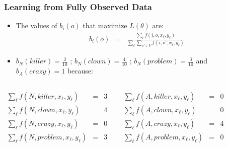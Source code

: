 \begin{frame}
\frametitle{Learning from Fully Observed Data}
\begin{itemize}[<+->]
\item The values of $b_{i}(o)$ that maximize $L(\theta)$ are:
\begin{eqnarray*}
b_i(o) & = & \frac{\sum_\ell f(i,o,x_\ell,y_\ell)}{\sum_\ell \sum_{o' \in V} f(i,o',x_\ell,y_\ell)} 
\end{eqnarray*}
\item $b_{N}(\textit{killer}) = \frac{3}{10}$ ;  $b_{N}(\textit{clown}) = \frac{4}{10}$ ; $b_{N}(\textit{problem}) = \frac{3}{10}$ and $b_{A}(\textit{crazy}) = 1$ because:
\end{itemize}

\begin{columns}[c]

\column{2in}
{\small\begin{eqnarray*}
\sum_\ell f(N, \textit{killer}, x_\ell, y_\ell) & = & 3 \\
\sum_\ell f(N, \textit{clown}, x_\ell, y_\ell) & = & 4 \\ 
\sum_\ell f(N, \textit{crazy}, x_\ell, y_\ell) & = & 0 \\ 
\sum_\ell f(N, \textit{problem}, x_\ell, y_\ell) & = & 3 \\ 
\end{eqnarray*}}

\column{1.5in}
{\small\begin{eqnarray*}
\sum_\ell f(A, \textit{killer}, x_\ell, y_\ell) & = & 0 \\
\sum_\ell f(A, \textit{clown}, x_\ell, y_\ell) & = & 0 \\ 
\sum_\ell f(A, \textit{crazy}, x_\ell, y_\ell) & = & 4 \\ 
\sum_\ell f(A, \textit{problem}, x_\ell, y_\ell) & = & 0 \\ 
\end{eqnarray*}}

\end{columns}
\end{frame}

